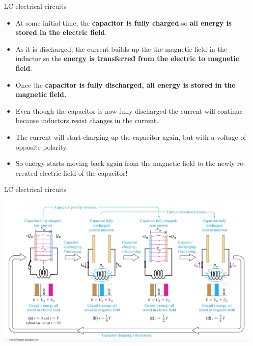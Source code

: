 %
%
%

\begin{frame}{LC electrical circuits}

\begin{itemize}
\item
  At some initial time, the {\bf capacitor is fully charged} so {\bf all energy is stored in the electric field}.\\
\item
  As it is discharged, the current builds up the the magnetic field in the inductor so the {\bf energy is
  transferred from the electric to magnetic field}.
\item
  Once the {\bf capacitor is fully discharged, all energy is stored in the magnetic field.}
  \vspace{0.3cm}
\item
  Even though the capacitor is now fully discharged the current will continue because
  inductors resist changes in the current.
\item
   The current will start charging up the capacitor again, but with a voltage of opposite polarity.
\item
   So energy starts moving back again from the magnetic field to the newly re-created electric
  field of the capacitor!
\end{itemize}

\end{frame}



%
%
%

\begin{frame}{LC electrical circuits}

\begin{center}
  \includegraphics[width=0.99\textwidth]{./images/schematics/LC_oscillations.png}\\
\end{center}

\end{frame}


